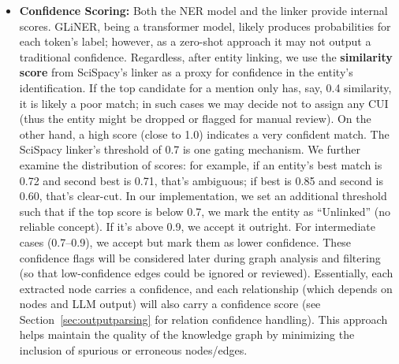 \begin{itemize}
\item \textbf{Confidence Scoring:} Both the NER model and the linker provide internal scores. GLiNER, being a transformer model, likely produces probabilities for each token's label; however, as a zero-shot approach it may not output a traditional confidence. Regardless, after entity linking, we use the \textbf{similarity score} from SciSpacy's linker as a proxy for confidence in the entity's identification. If the top candidate for a mention only has, say, 0.4 similarity, it is likely a poor match; in such cases we may decide not to assign any CUI (thus the entity might be dropped or flagged for manual review). On the other hand, a high score (close to 1.0) indicates a very confident match. The SciSpacy linker's threshold of 0.7 is one gating mechanism. We further examine the distribution of scores: for example, if an entity's best match is 0.72 and second best is 0.71, that's ambiguous; if best is 0.85 and second is 0.60, that's clear-cut. In our implementation, we set an additional threshold such that if the top score is below 0.7, we mark the entity as ``Unlinked'' (no reliable concept). If it's above 0.9, we accept it outright. For intermediate cases (0.7–0.9), we accept but mark them as lower confidence. These confidence flags will be considered later during graph analysis and filtering (so that low-confidence edges could be ignored or reviewed). Essentially, each extracted node carries a confidence, and each relationship (which depends on nodes and LLM output) will also carry a confidence score (see Section~\ref{sec:outputparsing} for relation confidence handling). This approach helps maintain the quality of the knowledge graph by minimizing the inclusion of spurious or erroneous nodes/edges.


\end{itemize}
